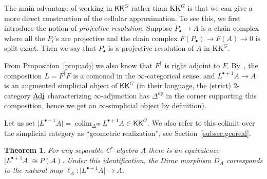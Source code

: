 \documentclass[a4paper,reqno]{amsart}
\theoremstyle{plain}
\newtheorem{theorem}{Theorem}[section]
\theoremstyle{definition}
\theoremstyle{remark}
\numberwithin{equation}{section}
\newcommand{\KK}{\mathrm{KK}}
\newcommand{\icKK}{\mathsf{KK}}
\newcommand{\gr}[1]{\lvert #1\rvert}
\newcommand{\opo}{\mathrm{op}}
\DeclareMathOperator*{\colim}{colim}
\begin{document}
The main advantage of working in $\icKK^G$ rather than $\KK^G$ is that we can give a more direct construction of the cellular approximation. To see this, we first introduce the notion of \emph{projective resolution}. Suppose $P_\bullet \to A$ is a chain complex where all the $P_i$'s are projective and the chain complex $F(P_\bullet)\to F(A)\to 0$ is split-exact. Then we say that $P_\bullet$ is a projective resolution of $A$ in $\KK^G$.

From Proposition~\ref{prop:adj} we also know that $F^\dagger$ is right adjoint to $F$.
By~\cite{MR3415698}, the composition $L=F^\dagger F$ is a comonad in the $\infty$-categorical sense, and $L^{\bullet+1} A \to A$ is an augmented simplicial object of $\icKK^G$ (in their language, the (strict) $2$-category $\underline{\smash{\mathrm{Adj}}}$ characterizing $\infty$-adjunction has $\Delta^\opo$ in the corner supporting this composition, hence we get an $\infty$-simplicial object by definition).

Let us set $\gr{L^{\bullet+1} A}=\colim_{\Delta^\opo} L^{\bullet+1} A \in \icKK^G$. We also refer to this colimit over the simplicial category as ``geometric realization'', see Section~\ref{subsec:georeal}.

\begin{theorem}\label{thm:cellapp-colim}
      For any separable C$^*$-algebra $A$ there is an equivalence $\gr{L^{\bullet+1} A}\cong P(A)$. Under this identification, the Dirac morphism $D_A$ corresponds to the natural map $\ell_A\colon \gr{L^{\bullet+1} A}\to A$.
\end{theorem}
\end{document}
